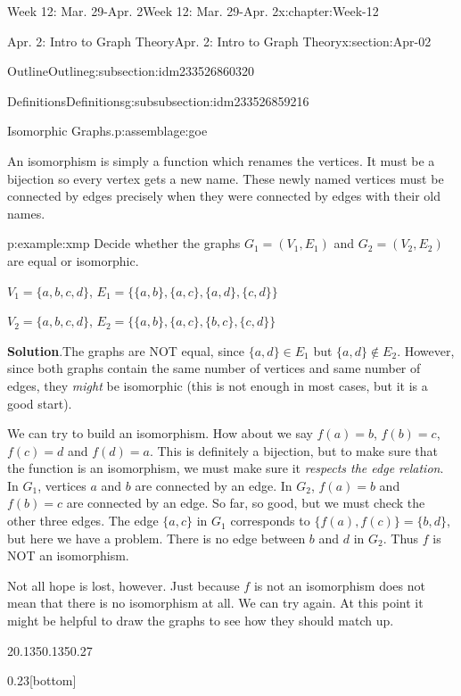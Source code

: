 \documentclass[oneside,10pt,]{book}
\newcommand{\blocktitlefont}{\relax}
\numberwithin{equation}{section}
\begin{document}
\begin{chapterptx}{Week 12: Mar. 29-Apr. 2}{}{Week 12: Mar. 29-Apr. 2}{}{}{x:chapter:Week-12}
\begin{sectionptx}{Apr. 2: Intro to Graph Theory}{}{Apr. 2: Intro to Graph Theory}{}{}{x:section:Apr-02}
\begin{subsectionptx}{Outline}{}{Outline}{}{}{g:subsection:idm233526860320}
\begin{subsubsectionptx}{Definitions}{}{Definitions}{}{}{g:subsubsection:idm233526859216}
\begin{assemblage}{Isomorphic Graphs.}{p:assemblage:goe}
\end{assemblage}
An isomorphism is simply a function which renames the vertices. It must be a bijection so every vertex gets a new name. These newly named vertices must be connected by edges precisely when they were connected by edges with their old names.%
\begin{example}{}{p:example:xmp}%
Decide whether the graphs \(G_1 = (V_1, E_1)\) and \(G_2 = (V_2, E_2)\) are equal or isomorphic.%
\par
\(V_1 = \{a,b,c,d\}\), \(E_1 = \{\{a,b\}, \{a,c\}, \{a,d\}, \{c,d\}\}\)%
\par
\(V_2 = \{a,b,c,d\}\), \(E_2 = \{\{a,b\}, \{a,c\}, \{b,c\}, \{c,d\}\}\)%
\par\smallskip%
\noindent\textbf{\blocktitlefont Solution}.\hypertarget{p:solution:jSE}{}\quad{}The graphs are NOT equal, since \(\{a,d\} \in E_1\) but \(\{a,d\} \notin E_2\). However, since both graphs contain the same number of vertices and same number of edges, they \emph{might} be isomorphic (this is not enough in most cases, but it is a good start).%
\par
We can try to build an isomorphism. How about we say \(f(a) = b\), \(f(b) = c\), \(f(c) = d\) and \(f(d) = a\). This is definitely a bijection, but to make sure that the function is an isomorphism, we must make sure it \emph{respects the edge relation}. In \(G_1\), vertices \(a\) and \(b\) are connected by an edge. In \(G_2\), \(f(a) = b\) and \(f(b) = c\) are connected by an edge. So far, so good, but we must check the other three edges. The edge \(\{a,c\}\) in \(G_1\) corresponds to \(\{f(a),
f(c)\} = \{b,d\}\), but here we have a problem. There is no edge between \(b\) and \(d\) in \(G_2\). Thus \(f\) is NOT an isomorphism.%
\par
Not all hope is lost, however. Just because \(f\) is not an isomorphism does not mean that there is no isomorphism at all. We can try again. At this point it might be helpful to draw the graphs to see how they should match up.%
\begin{sidebyside}{2}{0.135}{0.135}{0.27}%
\begin{sbspanel}{0.23}[bottom]%
\end{sbspanel}
\end{sidebyside}
\end{example}
\end{subsubsectionptx}
\end{subsectionptx}
\end{sectionptx}
\end{chapterptx}
\end{document}
